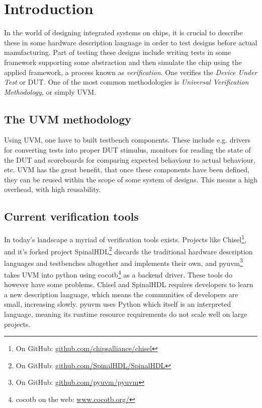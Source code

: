 \section{Introduction}\label{sec:02}
In the world of designing integrated systems on chips, it is crucial to describe these in some hardware description language in order to test designs before actual manufacturing. Part of testing these designs include writing tests in some framework supporting some abstraction and then simulate the chip using the applied framework, a process known as \emph{verification}. One verifies the \emph{Device Under Test} or DUT. One of the most common methodologies is \emph{Universal Verification Methodology}, or simply UVM.
\subsection{The UVM methodology}
Using UVM, one have to built testbench components. These include e.g. drivers for converting tests into proper DUT stimulus, monitors for reading the state of the DUT and scoreboards for comparing expected behaviour to actual behaviour, etc. UVM has the great benefit, that once these components have been defined, they can be reused within the scope of some system of designs. This means a high overhead, with high reusability.
\subsection{Current verification tools}
In today's landscape a myriad of verification tools exists. Projects like Chisel\footnote{On GitHub: \href{https://github.com/chipsalliance/chisel}{github.com/chipsalliance/chisel}}, and it's forked project SpinalHDL\footnote{On GitHub: \href{https://github.com/SpinalHDL/SpinalHDL}{github.com/SpinalHDL/SpinalHDL}} discards the traditional hardware description languages and testbenches altogether and implements their own, and pyuvm\footnote{On GitHub: \href{https://github.com/pyuvm/pyuvm}{github.com/pyuvm/pyuvm}} takes UVM into python using cocotb\footnote{cocotb on the web: \href{https://www.cocotb.org/}{www.cocotb.org/}} as a backend driver. These tools do however have some problems. Chisel and SpinalHDL requires developers to learn a new description language, which means the communities of developers are small, increasing slowly. pyuvm uses Python which itself is an interpreted language, meaning its runtime resource requirements do not scale well on large projects.
